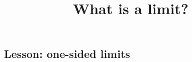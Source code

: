 \documentclass{ximera}
\title{What is a limit?}
\begin{document}
\subsection{Lesson: one-sided limits}

\begin{center}
\end{center}
\end{document}
